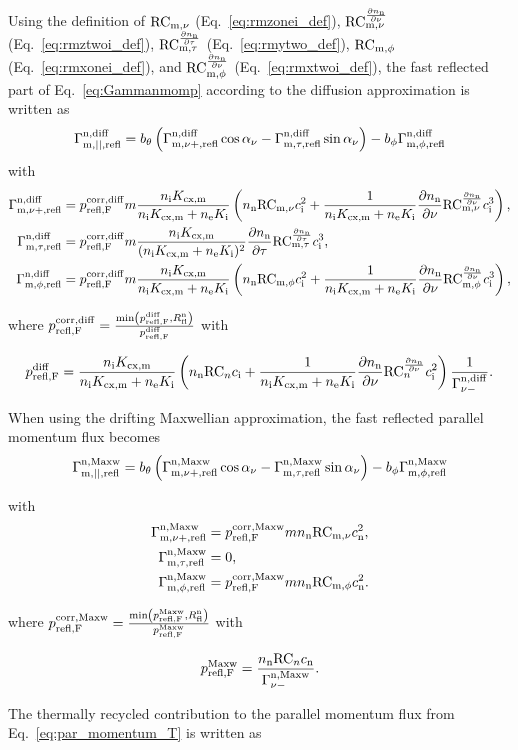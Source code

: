 Using the definition of $\rmzonei$ (Eq.~\eqref{eq:rmzonei_def}), $\rmztwoi$ (Eq.~\eqref{eq:rmztwoi_def}), $\rmytwoi$ (Eq.~\eqref{eq:rmytwo_def}), $\rmxonei$ (Eq.~\eqref{eq:rmxonei_def}), and $\rmxtwoi$ (Eq.~\eqref{eq:rmxtwoi_def}), the fast reflected part of Eq.~\eqref{eq:Gammanmomp} according to the diffusion approximation is written as
\begin{equation}
    \Gamma^{\mathrm{n,diff}}_{\mathrm{m,||,refl}} = \pit \left( \fmozrefld \cosa - \fmoyrefld \sina \right) - \pitt \fmoxrefld
\end{equation}
with
\begin{align}
    \fmozrefld & = \pcorfnd m \frac{\vcx}{\vtot} \left( \nn \rmzonei \ci^2 + \frac{1}{\vtot} \dnndz \rmztwoi \ci^3 \right),\\
    \fmoyrefld & = \pcorfnd m \frac{\vcx}{(\vtot)^2} \dnndy \rmytwoi \ci^3, \\
    \fmoxrefld & = \pcorfnd m \frac{\vcx}{\vtot} \left( \nn \rmxonei \ci^2 + \frac{1}{\vtot} \dnndz \rmxtwoi \ci^3 \right),
\end{align}

where $ \pcorfnd = \frac{\min \left( \pfnd, \Rnxfl \right)}{\pfnd}$ with

\begin{equation}
    \pfnd = \frac{\vcx}{\vtot} \left( \nn \rconei \ci + \frac{1}{\vtot}\dnndz \rctwoi \ci^2 \right) \frac{1}{\fnnid}.
\end{equation}

When using the drifting Maxwellian approximation, the fast reflected parallel momentum flux becomes
\begin{equation}
    \Gamma^{\mathrm{n,Maxw}}_{\mathrm{m,||,refl}} = \pit \left( \fmozreflm \cosa - \fmoyreflm \sina \right) - \pitt \fmoxreflm
\end{equation}

with
\begin{align}
    \fmozreflm & = \pcorfnm m \nn \rmzonei \cn^2, \\
    \fmoyreflm & = 0, \\
    \fmoxreflm & = \pcorfnm m \nn \rmxonei \cn^2.
\end{align}

where $ \pcorfnm = \frac{\min \left( \pfnm, \Rnxfl \right)}{\pfnm}$ with

\begin{equation}
    \pfnm = \frac{ \nn \rconei \cn}{\fnnim} .
\end{equation}

The thermally recycled contribution to the parallel momentum flux from Eq.~\eqref{eq:par_momentum_T} is written as

